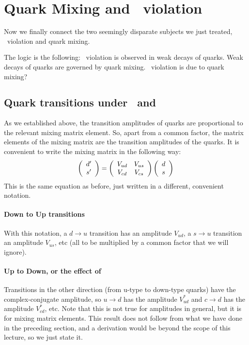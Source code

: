 \section{Quark Mixing and \cp\ violation}

 Now we finally connect the two seemingly disparate subjects we just
 treated, \cp\ violation and quark mixing.

 The logic is the following: \cp\ violation is observed in weak decays of
 quarks. Weak decays of quarks are governed by quark mixing. \cp\
 violation is due to quark mixing?

\subsection{Quark transitions under \cp\ and \ts}
 As we established above, the transition amplitudes of quarks are
 proportional to the relevant mixing matrix element. So, apart from a
 common factor, the matrix elements of the mixing matrix are the
 transition amplitudes of the quarks. It is convenient to write the
 mixing matrix in the following way:
\begin{equation}
  \left( \begin{array}{c} d^{\prime} \\ s^{\prime} \end{array} \right) =
  \left( \begin{array}{cc} V_{ud} & V_{us} \\ V_{cd} & V_{cs} \end{array} \right)
  \left( \begin{array}{c} d \\ s \end{array} \right)
\end{equation}
  This is the same equation as before, just written in a different,
  convenient notation.

\paragraph{Down to Up transitions}
  With this notation, a $d\to u$ transition has an
  amplitude $V_{ud}$, a $s \to u$ transition an amplitude $V_{us}$,
  etc (all to be multiplied by a common factor that we will ignore).

\paragraph{Up to Down, or the effect of \ts}
  Transitions in the other direction (from u-type to down-type quarks)
  have the complex-conjugate amplitude, so $u\to d$ has the amplitude
  $V^{*}_{ud}$ and $c\to d$ has the amplitude
  $V^{*}_{cd}$, etc. Note that this is not true for amplitudes in
  general, but it is for mixing matrix elements. This result does not
  follow from what we have done in the preceding section, and a
  derivation would be beyond the scope of this lecture, so we just
  state it.

